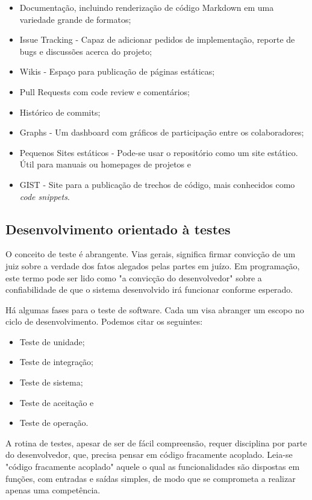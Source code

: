 \documentclass[
	article,			%
	12pt,				%
	oneside,			%
	a4paper,			%
	english,			
	brazil,
	sumario=tradicional
	]{abntex2}
\begin{document}
\begin{itemize}
	\item{Documentação, incluindo renderização de código Markdown em uma variedade grande de formatos;}
	\item{Issue Tracking - Capaz de adicionar pedidos de implementação, reporte de bugs e discussões acerca do projeto;}
	\item{Wikis - Espaço para publicação de páginas estáticas;}
	\item{Pull Requests com code review e comentários;}
	\item{Histórico de commits;}
	\item{Graphs - Um dashboard com gráficos de participação entre os colaboradores;}
	\item{Pequenos Sites estáticos - Pode-se usar o repositório como um site estático. Útil para manuais ou homepages de projetos e}
	\item{GIST - Site para a publicação de trechos de código, mais conhecidos como \textit{code snippets}.}
\end{itemize}


\subsection{Desenvolvimento orientado à testes}

O conceito de teste é abrangente. Vias gerais, significa firmar convicção de um juiz sobre a verdade dos fatos alegados pelas partes em juízo. Em programação, este termo pode ser lido como "a convicção do desenvolvedor" sobre a confiabilidade de que o sistema desenvolvido irá funcionar conforme esperado.

Há algumas fases para o teste de software. Cada um visa abranger um escopo no ciclo de desenvolvimento. Podemos citar os seguintes:
\begin{itemize}
	\item Teste de unidade;
	\item Teste de integração;
	\item Teste de sistema;
	\item Teste de aceitação e
	\item Teste de operação.
\end{itemize}

A rotina de testes, apesar de ser de fácil compreensão, requer disciplina por parte do desenvolvedor, que, precisa pensar em código fracamente acoplado. Leia-se "código fracamente acoplado" aquele o qual as funcionalidades são dispostas em funções, com entradas e saídas simples, de modo que se comprometa a realizar apenas uma competência.
\end{document}
